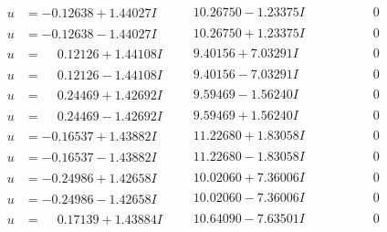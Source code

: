 \documentclass[1p]{elsarticle_modified}
\theoremstyle{definition}
\begin{document}
$$\begin{array}{c|c|c}
\begin{aligned}
u &= -0.12638 + 1.44027 I\end{aligned}
 & \phantom{-}10.26750 - 1.23375 I & \phantom{-0.000000 } 0 \\ \hline\begin{aligned}
u &= -0.12638 - 1.44027 I\end{aligned}
 & \phantom{-}10.26750 + 1.23375 I & \phantom{-0.000000 } 0 \\ \hline\begin{aligned}
u &= \phantom{-}0.12126 + 1.44108 I\end{aligned}
 & \phantom{-}9.40156 + 7.03291 I & \phantom{-0.000000 } 0 \\ \hline\begin{aligned}
u &= \phantom{-}0.12126 - 1.44108 I\end{aligned}
 & \phantom{-}9.40156 - 7.03291 I & \phantom{-0.000000 } 0 \\ \hline\begin{aligned}
u &= \phantom{-}0.24469 + 1.42692 I\end{aligned}
 & \phantom{-}9.59469 - 1.56240 I & \phantom{-0.000000 } 0 \\ \hline\begin{aligned}
u &= \phantom{-}0.24469 - 1.42692 I\end{aligned}
 & \phantom{-}9.59469 + 1.56240 I & \phantom{-0.000000 } 0 \\ \hline\begin{aligned}
u &= -0.16537 + 1.43882 I\end{aligned}
 & \phantom{-}11.22680 + 1.83058 I & \phantom{-0.000000 } 0 \\ \hline\begin{aligned}
u &= -0.16537 - 1.43882 I\end{aligned}
 & \phantom{-}11.22680 - 1.83058 I & \phantom{-0.000000 } 0 \\ \hline\begin{aligned}
u &= -0.24986 + 1.42658 I\end{aligned}
 & \phantom{-}10.02060 + 7.36006 I & \phantom{-0.000000 } 0 \\ \hline\begin{aligned}
u &= -0.24986 - 1.42658 I\end{aligned}
 & \phantom{-}10.02060 - 7.36006 I & \phantom{-0.000000 } 0 \\ \hline\begin{aligned}
u &= \phantom{-}0.17139 + 1.43884 I\end{aligned}
 & \phantom{-}10.64090 - 7.63501 I & \phantom{-0.000000 } 0 \\ \hline\begin{aligned}

\end{aligned}
\end{array}$$
\end{document}
